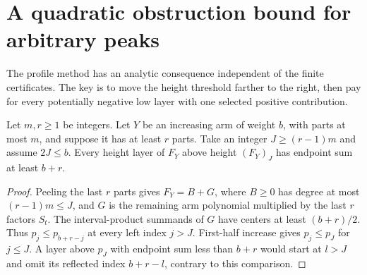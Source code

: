 \section{A quadratic obstruction bound for arbitrary peaks}\label{sec:uniform}
The profile method has an analytic consequence independent of the finite certificates. The key is to move the height threshold farther to the right, then pay for every potentially negative low layer with one selected positive contribution.

\begin{lemma}\label{lem:errorhigh}
Let $m,r\ge1$ be integers. Let $Y$ be an increasing arm of weight $b$, with parts at most $m$, and suppose it has at least $r$ parts. Take an integer $J\ge(r-1)m$ and assume $2J\le b$. Every height layer of $F_Y$ above height $(F_Y)_J$ has endpoint sum at least $b+r$.
\end{lemma}
\begin{proof}
Peeling the last $r$ parts gives $F_Y=B+G$, where $B\ge0$ has degree at most $(r-1)m\le J$, and $G$ is the remaining arm polynomial multiplied by the last $r$ factors $S_t$. The interval-product summands of $G$ have centers at least $(b+r)/2$. Thus $p_j\le p_{b+r-j}$ at every left index $j>J$. First-half increase gives $p_j\le p_J$ for $j\le J$. A layer above $p_J$ with endpoint sum less than $b+r$ would start at $l>J$ and omit its reflected index $b+r-l$, contrary to this comparison.
\end{proof}

